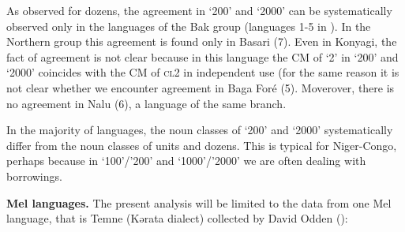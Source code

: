 \begin{table}
\caption{\label{tab:1:14} Agreement in `200' and `2000'}

\end{table}


As observed for dozens, the agreement in ‘200’ and ‘2000’ can be systematically observed only in the languages of the Bak group (languages 1-5 in ). In the Northern group this agreement is found only in Basari (7). Even in Konyagi, the fact of agreement is not clear because in this language the CM of ‘2’ in ‘200’ and ‘2000’ coincides with the CM of \textsc{cl}2 in independent use (for the same reason it is not clear whether we encounter agreement in Baga Foré (5). Moverover, there is no agreement in Nalu (6), a language of the same branch. 

In the majority of languages, the noun classes of ‘200’ and ‘2000’ systematically differ from the noun classes of units and dozens. This is typical for Niger-Congo, perhaps because in ‘100’/’200’ and ‘1000’/’2000’ we are often dealing with borrowings.

\textbf{Mel languages.} The present analysis will be limited to the data from one Mel language, that is Temne (Kərata dialect) collected by David Odden ():


